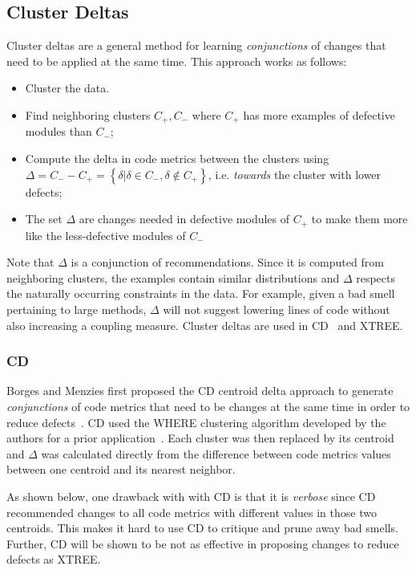 \documentclass[twocolumn,5p]{elsarticle}
\theoremstyle{break}
\begin{document}
	
	\subsection{Cluster Deltas}
	
	Cluster deltas are a general method
	for learning {\em conjunctions} of changes
	that need to be applied at the same time. 
	This approach works as follows:
	\begin{itemize}
		\item Cluster the data. 
		\item Find
		neighboring clusters $C_+,C_-$ where $C_+$ has more examples of defective
		modules than $C_-$;
		\item Compute the  delta   in code metrics between the clusters using \mbox{$\Delta = C_- - C_+ = \left\{\delta|\delta\in C_-, \delta \notin C_+\right\}$}, i.e.
		{\em towards} the cluster with lower defects;
		\item The set $\Delta$ are changes needed in defective modules of $C_+$ to
		make them more like the less-defective modules of $C_-$
	\end{itemize}
	Note that $\Delta$ is a conjunction of  recommendations.
	Since it is computed
	from neighboring clusters, the examples contain similar distributions and $\Delta$ respects the naturally occurring constraints in the data. For example,
	given a bad smell pertaining to large methods,   $\Delta$   will not  suggest lowering lines of code
	without also increasing a coupling measure. 
	Cluster deltas are used in CD~\cite{me12c} and XTREE.
	
	
	
	\subsubsection{CD}\label{sec:cdcd}
	Borges and Menzies first proposed the CD centroid delta approach to
	generate {\em conjunctions} of code metrics
	that need to be changes at the same time
	in order to reduce defects~\cite{me12c}.
	CD used the WHERE clustering algorithm developed by the
	authors for a prior application~\cite{localvsglobal}.
	Each cluster was then replaced by its centroid
	and $\Delta$ was calculated directly from the difference
	between code metrics values between one centroid
	and its nearest neighbor.
	
	
	As shown below, one drawback with with CD is that it is {\em verbose}
	since
	CD   recommended changes to all code
	metrics with different values in those two centroids. 
	This makes it hard to use CD to   critique and prune away bad smells. Further, CD will be shown to be
	not as effective
	in proposing changes to reduce defects as XTREE.
	
\end{document}
